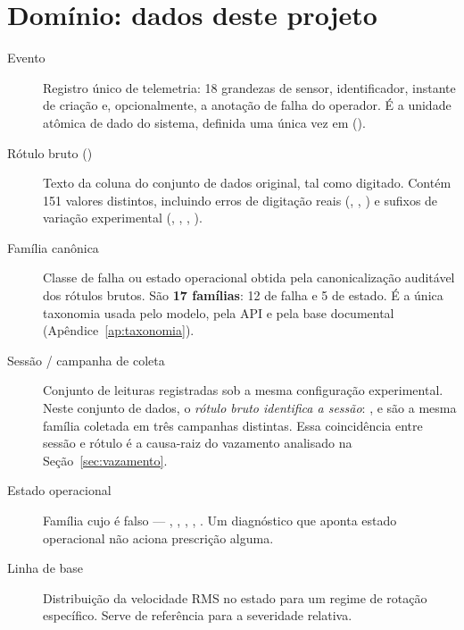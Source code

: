 \section{Domínio: dados deste projeto}

\begin{description}
  \item[Evento] Registro único de telemetria: 18 grandezas de sensor,
    identificador, instante de criação e, opcionalmente, a anotação de falha do
    operador. É a unidade atômica de dado do sistema, definida uma única vez em
     ().

  \item[Rótulo bruto ()] Texto da coluna  do conjunto
    de dados original, tal como digitado. Contém \num{151} valores distintos,
    incluindo erros de digitação reais (,
    , ) e sufixos de variação
    experimental (, , , ).

  \item[Família canônica] Classe de falha ou estado operacional obtida pela
    canonicalização auditável dos rótulos brutos. São \textbf{17 famílias}: 12
    de falha e 5 de estado. É a única taxonomia usada pelo modelo, pela API e
    pela base documental (Apêndice~\ref{ap:taxonomia}).

  \item[Sessão / campanha de coleta] Conjunto de leituras registradas sob a
    mesma configuração experimental. Neste conjunto de dados, o \emph{rótulo
    bruto identifica a sessão}: ,
     e  são a mesma família
    coletada em três campanhas distintas. Essa coincidência entre sessão e
    rótulo é a causa-raiz do vazamento analisado na
    Seção~\ref{sec:vazamento}.

  \item[Estado operacional] Família cujo  é falso ---
    , , , ,
    . Um diagnóstico que aponta estado operacional não
    aciona prescrição alguma.

  \item[Linha de base] Distribuição da velocidade RMS no estado 
    para um regime de rotação específico. Serve de referência para a severidade
    relativa.
\end{description}


